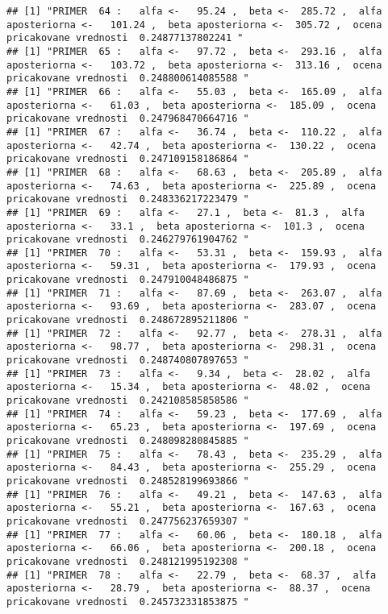\documentclass[
]{article}
\begin{document}
\begin{verbatim}
## [1] "PRIMER  64 :   alfa <-   95.24 ,  beta <-  285.72 ,  alfa aposteriorna <-   101.24 ,  beta aposteriorna <-  305.72 ,  ocena pricakovane vrednosti  0.24877137802241 "
## [1] "PRIMER  65 :   alfa <-   97.72 ,  beta <-  293.16 ,  alfa aposteriorna <-   103.72 ,  beta aposteriorna <-  313.16 ,  ocena pricakovane vrednosti  0.248800614085588 "
## [1] "PRIMER  66 :   alfa <-   55.03 ,  beta <-  165.09 ,  alfa aposteriorna <-   61.03 ,  beta aposteriorna <-  185.09 ,  ocena pricakovane vrednosti  0.247968470664716 "
## [1] "PRIMER  67 :   alfa <-   36.74 ,  beta <-  110.22 ,  alfa aposteriorna <-   42.74 ,  beta aposteriorna <-  130.22 ,  ocena pricakovane vrednosti  0.247109158186864 "
## [1] "PRIMER  68 :   alfa <-   68.63 ,  beta <-  205.89 ,  alfa aposteriorna <-   74.63 ,  beta aposteriorna <-  225.89 ,  ocena pricakovane vrednosti  0.248336217223479 "
## [1] "PRIMER  69 :   alfa <-   27.1 ,  beta <-  81.3 ,  alfa aposteriorna <-   33.1 ,  beta aposteriorna <-  101.3 ,  ocena pricakovane vrednosti  0.246279761904762 "
## [1] "PRIMER  70 :   alfa <-   53.31 ,  beta <-  159.93 ,  alfa aposteriorna <-   59.31 ,  beta aposteriorna <-  179.93 ,  ocena pricakovane vrednosti  0.247910048486875 "
## [1] "PRIMER  71 :   alfa <-   87.69 ,  beta <-  263.07 ,  alfa aposteriorna <-   93.69 ,  beta aposteriorna <-  283.07 ,  ocena pricakovane vrednosti  0.248672895211806 "
## [1] "PRIMER  72 :   alfa <-   92.77 ,  beta <-  278.31 ,  alfa aposteriorna <-   98.77 ,  beta aposteriorna <-  298.31 ,  ocena pricakovane vrednosti  0.248740807897653 "
## [1] "PRIMER  73 :   alfa <-   9.34 ,  beta <-  28.02 ,  alfa aposteriorna <-   15.34 ,  beta aposteriorna <-  48.02 ,  ocena pricakovane vrednosti  0.242108585858586 "
## [1] "PRIMER  74 :   alfa <-   59.23 ,  beta <-  177.69 ,  alfa aposteriorna <-   65.23 ,  beta aposteriorna <-  197.69 ,  ocena pricakovane vrednosti  0.248098280845885 "
## [1] "PRIMER  75 :   alfa <-   78.43 ,  beta <-  235.29 ,  alfa aposteriorna <-   84.43 ,  beta aposteriorna <-  255.29 ,  ocena pricakovane vrednosti  0.248528199693866 "
## [1] "PRIMER  76 :   alfa <-   49.21 ,  beta <-  147.63 ,  alfa aposteriorna <-   55.21 ,  beta aposteriorna <-  167.63 ,  ocena pricakovane vrednosti  0.247756237659307 "
## [1] "PRIMER  77 :   alfa <-   60.06 ,  beta <-  180.18 ,  alfa aposteriorna <-   66.06 ,  beta aposteriorna <-  200.18 ,  ocena pricakovane vrednosti  0.248121995192308 "
## [1] "PRIMER  78 :   alfa <-   22.79 ,  beta <-  68.37 ,  alfa aposteriorna <-   28.79 ,  beta aposteriorna <-  88.37 ,  ocena pricakovane vrednosti  0.245732331853875 "

\end{verbatim}
\end{document}
